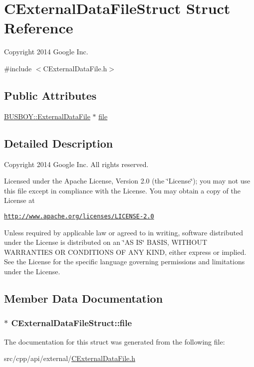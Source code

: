\hypertarget{structCExternalDataFileStruct}{
\section{CExternalDataFileStruct Struct Reference}
\label{structCExternalDataFileStruct}
}


Copyright 2014 Google Inc.  


{\ttfamily \#include $<$CExternalDataFile.h$>$}\subsection*{Public Attributes}
\begin{DoxyCompactItemize}
\item 
\hyperlink{classBUSBOY_1_1ExternalDataFile}{BUSBOY::ExternalDataFile} $\ast$ \hyperlink{structCExternalDataFileStruct_ab48ba215f9bbbc41af7436fa6eb52bb2}{file}
\end{DoxyCompactItemize}


\subsection{Detailed Description}
Copyright 2014 Google Inc. All rights reserved.

Licensed under the Apache License, Version 2.0 (the \char`\"{}License\char`\"{}); you may not use this file except in compliance with the License. You may obtain a copy of the License at

\href{http://www.apache.org/licenses/LICENSE-2.0}{\tt http://www.apache.org/licenses/LICENSE-\/2.0}

Unless required by applicable law or agreed to in writing, software distributed under the License is distributed on an \char`\"{}AS IS\char`\"{} BASIS, WITHOUT WARRANTIES OR CONDITIONS OF ANY KIND, either express or implied. See the License for the specific language governing permissions and limitations under the License. 

\subsection{Member Data Documentation}
\hypertarget{structCExternalDataFileStruct_ab48ba215f9bbbc41af7436fa6eb52bb2}{
\subsubsection[{file}]{$\ast$ {\bf CExternalDataFileStruct::file}}}
\label{structCExternalDataFileStruct_ab48ba215f9bbbc41af7436fa6eb52bb2}


The documentation for this struct was generated from the following file:\begin{DoxyCompactItemize}
\item 
src/cpp/api/external/\hyperlink{CExternalDataFile_8h}{CExternalDataFile.h}\end{DoxyCompactItemize}
